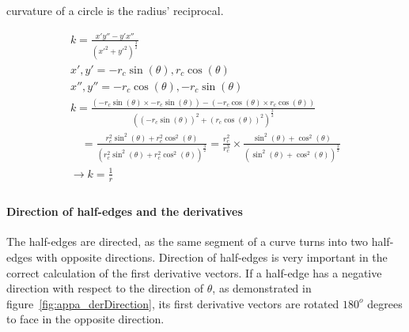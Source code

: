 curvature of a circle is the radius' reciprocal.

\[
\begin{array}{l}
k = \frac{ x'y'' - y'x'' }{ \left(x'^2+y'^2\right)^{\frac{3}{2}}}\\
x', y' =  -r_c\sin(\theta), r_c\cos(\theta)\\
x'', y'' = -r_c\cos(\theta), -r_c\sin(\theta) \\
k = \frac{\left(-r_c\sin(\theta) \times -r_c\sin(\theta)\right) - \left(-r_c\cos(\theta) \times r_c\cos(\theta)\right)} {\left(\left(-r_c\sin(\theta)\right)^2 + \left(r_c\cos(\theta)\right)^2\right)^{\frac{3}{2}} } \\
\quad = \frac{ r_c^2\sin^2(\theta) + r_c^2\cos^2(\theta)}{ \left(r_c^2\sin^2(\theta) + r_c^2\cos^2(\theta)\right)^{\frac{3}{2}}} = \frac{r_c^2}{r_c^3} \times \frac{ \sin^2(\theta) + \cos^2(\theta)}{ \left(\sin^2(\theta) + \cos^2(\theta)\right)^{\frac{3}{2}}}\\
\rightarrow k = \frac{1}{r}\\
\end{array}
\]

\paragraph{Direction of half-edges and the derivatives}
The half-edges are directed, as the same segment of a curve turns into two half-edges with opposite directions.
Direction of half-edges is very important in the correct calculation of the first derivative vectors.
If a half-edge has a negative direction with respect to the direction of $\theta$, as demonstrated in figure~\ref{fig:appa_derDirection}, its first derivative vectors are rotated $180^o$ degrees to face in the opposite direction.



